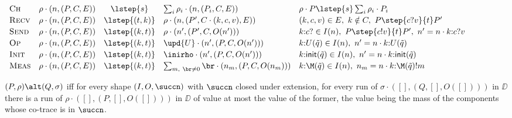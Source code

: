 \begin{table}[h]
\centering
\footnotesize
$\begin{array}{l@{\quad}rcl@{\quad}l}
\textsc{Ch} & \rho \cdot (n,(P,C,E)) &\lstep{s}& \textstyle\sum_i \rho_i \cdot (n,(P_i,C,E))
  & \rho \cdot P \lstep{s} \sum_i \rho_i \cdot P_i \\[2pt]
\textsc{Recv} & \rho \cdot (n,(P,C,E)) &\lstep{(t,k)}& \rho \cdot (n,(P',C \cdot (k,c,v),E))
  & (k,c,v) \in E,\ k \notin C,\ P \step{c?v}{t} P' \\[2pt]
\textsc{Send} & \rho \cdot (n,(P,C,E)) &\lstep{(k,t)}& \rho \cdot (n',(P',C,O(n')))
  & k{:}c? \in I(n),\ P \step{c!v}{t} P',\ n' = n \cdot k{:}c?v \\[2pt]
\textsc{Op} & \rho \cdot (n,(P,C,E)) &\lstep{(k,t)}& \upd{U} \cdot (n',(P,C,O(n')))
  & k{:}U(\tilde q) \in I(n),\ n' = n \cdot k{:}U(\tilde q) \\[2pt]
\textsc{Init} & \rho \cdot (n,(P,C,E)) &\lstep{(k,t)}& \inirho \cdot (n',(P,C,O(n')))
  & k{:}\mathsf{init}(\tilde q) \in I(n),\ n' = n \cdot k{:}\mathsf{init}(\tilde q) \\[2pt]
\textsc{Meas} & \rho \cdot (n,(P,C,E)) &\lstep{(k,t)}& \textstyle\sum_{m,\ \br \neq 0} \br \cdot (n_m,(P,C,O(n_m)))
  & k{:}\M(\tilde q) \in I(n),\ n_m = n \cdot k{:}\M(\tilde q)!m
\end{array}$
\caption{The step of a component of $\DD$, for a shape $(I, O, \succn)$.}
\label{tab:dlts}
\end{table}

\begin{definition}\label{def:alt}
$(P,\rho) \alt (Q,\sigma)$ iff for every shape $(I, O, \succn)$ with
$\succn$ closed under extension, for every run of
$\sigma \cdot ([],(Q,[],O([])))$ in $\DD$ there is a run of
$\rho \cdot ([],(P,[],O([])))$ in $\DD$ of value at most the value of the
former, the value being the mass of the components whose co-trace is in
$\succn$.
\end{definition}

